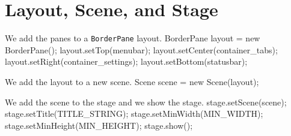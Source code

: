\documentclass{article}
\def\nwendcode{\endtrivlist \endgroup}      %
\let\nwdocspar=\par
\begin{document}
\section{Layout, Scene, and Stage}
We add the panes to a {\tt{}BorderPane} layout.
\nwenddocs{}\endmoddef{}
BorderPane layout = new BorderPane();
layout.setTop(menubar);
layout.setCenter(container_tabs);
layout.setRight(container_settings);
layout.setBottom(statusbar);
\nwendcode{}\nwdocspar

We add the layout to a new scene.
\nwenddocs{}\endmoddef{}
Scene scene = new Scene(layout);
\nwendcode{}\nwdocspar

We add the scene to the stage and we show the stage.
\nwenddocs{}\endmoddef{}
stage.setScene(scene);
stage.setTitle(TITLE_STRING);
stage.setMinWidth(MIN_WIDTH);
stage.setMinHeight(MIN_HEIGHT);
stage.show();
\nwendcode{}
\end{document}

